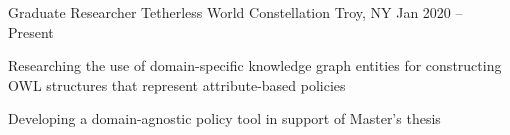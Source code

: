 
\begin{cventries}

  \cventry
  {Graduate Researcher}
  {Tetherless World Constellation}
  {Troy, NY}
  {Jan 2020 -- Present}
  {
    \begin{cvitems}
      \item {
                  Researching the use of domain-specific knowledge graph entities for constructing OWL structures that represent attribute-based policies
            }
      \item {
                  Developing a domain-agnostic policy tool in support of Master's thesis
            }
    \end{cvitems}
  }
\end{cventries}